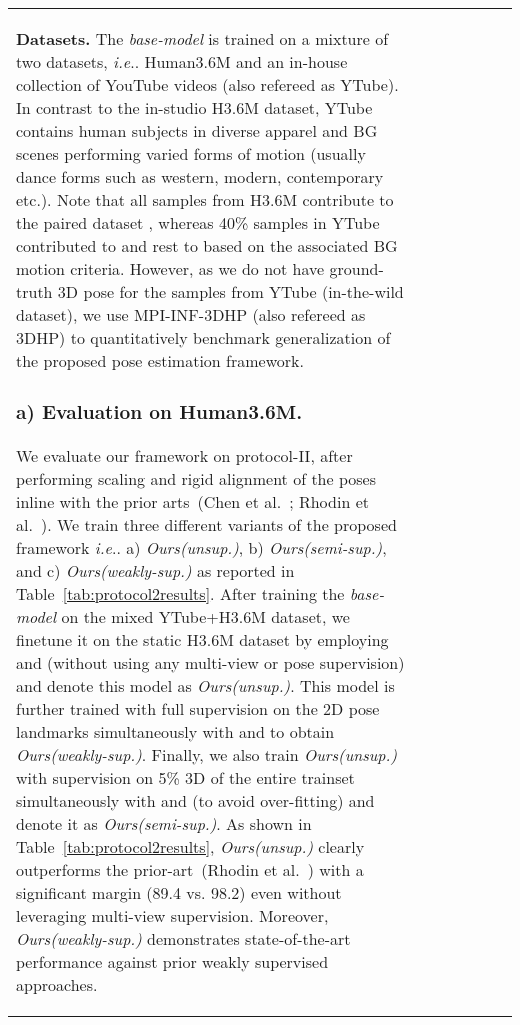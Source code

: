 \documentclass[letterpaper]{article} \usepackage{aaai20}  \usepackage{times}  \usepackage{helvet}  \usepackage{courier}  \usepackage{url}  \usepackage{graphicx}  \usepackage{amsmath}
\makeatletter
\DeclareRobustCommand\onedot{\futurelet\@let@token\@onedot}
\def\@onedot{\ifx\@let@token.\else.\null\fi\xspace}
\def\ie{\emph{i.e}\onedot} \def\Ie{\emph{I.e}\onedot}
\makeatother
\begin{document}
\begin{table}[t]
{\begin{tabular}{l|ccc|cc|c}
{{\textbf{Datasets.} The \textit{base-model} is trained on a mixture of two datasets, \ie Human3.6M and an in-house collection of YouTube videos (also refereed as YTube). In contrast to the in-studio H3.6M dataset, YTube contains human subjects in diverse apparel and BG scenes performing varied forms of motion (usually dance forms such as western, modern, contemporary etc.). Note that all samples from H3.6M contribute to the paired dataset , whereas 40\% samples in YTube contributed to  and rest to  based on the associated BG motion criteria. However, as we do not have ground-truth 3D pose for the samples from YTube (in-the-wild dataset), we use MPI-INF-3DHP (also refereed as 3DHP) to quantitatively benchmark generalization of the proposed pose estimation framework.

\subsubsection{a) Evaluation on Human3.6M.}
We evaluate our framework on protocol-II, after performing scaling and rigid alignment of the poses inline with the prior arts~({\color{coolblack}Chen et al.~\citeyear{chen2019unsupervised}}; {\color{coolblack}Rhodin et al.~\citeyear{rhodin2018unsupervised}}). We train three different variants of the proposed framework \ie a) \textit{Ours(unsup.)}, b) \textit{Ours(semi-sup.)}, and c) \textit{Ours(weakly-sup.)} as reported in Table~\ref{tab:protocol2results}. After training the \textit{base-model} on the mixed YTube+H3.6M dataset, we finetune it on the static H3.6M dataset by employing  and  (without using any multi-view or pose supervision) and denote this model as \textit{Ours(unsup.)}. This model is further trained with full supervision on the 2D pose landmarks simultaneously with  and  to obtain \textit{Ours(weakly-sup.)}. Finally, we also train \textit{Ours(unsup.)} with supervision on 5\% 3D of the entire trainset simultaneously with  and  (to avoid over-fitting) and denote it as \textit{Ours(semi-sup.)}. As shown in Table~\ref{tab:protocol2results}, \textit{Ours(unsup.)} clearly outperforms the prior-art~({\color{coolblack}Rhodin et al.~\citeyear{rhodin2018unsupervised}}) with a significant margin (89.4 vs. 98.2) even without leveraging multi-view supervision. Moreover, \textit{Ours(weakly-sup.)} demonstrates state-of-the-art performance against prior weakly supervised approaches. 

}}
\end{tabular}}
\end{table}
\end{document}
